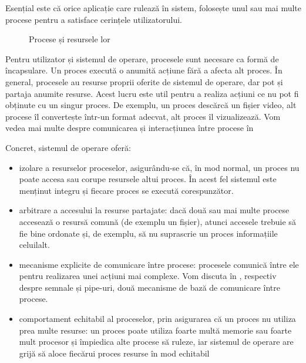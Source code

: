 \begin{note}
Esențial este că orice aplicație care rulează în sistem, folosește unul sau mai multe procese pentru a satisface cerințele utilizatorului.
\end{note}

\begin{figure}[!htbp]
	\centering
	\def\svgwidth{0.5\textwidth}
	
	\caption{Procese și resursele lor}
	\label{fig:process:overview}
\end{figure}

Pentru utilizator și sistemul de operare, procesele sunt necesare ca formă de
încapsulare. Un proces execută o anumită acțiune fără a afecta alt
proces. În general, procesele au resurse proprii oferite de sistemul de operare,
dar pot și partaja anumite resurse. Acest lucru este util pentru a realiza
acțiuni ce nu pot fi obținute cu un singur proces. De exemplu, un proces
descărcă un fișier video, alt procese îl convertește într-un format adecvat, alt
proces îl vizualizează. Vom vedea mai multe despre comunicarea și interacțiunea
între procese în 

Concret, sistemul de operare oferă:

\begin{itemize}
	\item izolare a resurselor proceselor, asigurându-se că, în mod normal,
		un proces nu poate accesa sau corupe resursele altui proces. În
		acest fel sistemul este menținut integru și fiecare proces se
		execută corespunzător.
	\item arbitrare a accesului la resurse partajate: dacă două sau mai
		multe procese accesează o resursă comună (de exemplu un fișier),
		atunci accesele trebuie să fie bine ordonate și, de exemplu, să
		nu suprascrie un proces informațiile celuilalt.
	\item mecanisme explicite de comunicare între procese: procesele
		comunică între ele pentru realizarea unei acțiuni mai complexe.
                Vom discuta în , respectiv  despre semnale și pipe-uri,
		două mecanisme de bază de comunicare între procese.
	\item comportament echitabil al proceselor, prin asigurarea că un proces
		nu utiliza prea multe resurse: un proces poate utiliza foarte
		multă memorie sau foarte mult procesor și împiedica alte procese
		să ruleze, iar sistemul de operare are grijă să aloce fiecărui
		proces resurse în mod echitabil
\end{itemize}


